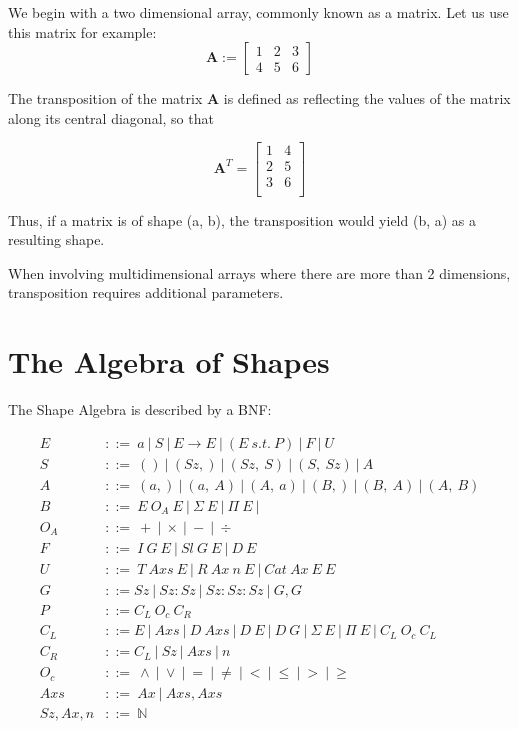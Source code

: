 \documentclass{article}
\begin{document}
We begin with a two dimensional array, commonly known as a matrix. Let us use this matrix for example:
\begin{equation*}
  \mathbf{A} :=
\begin{bmatrix}
  1 & 2 & 3\\
  4 & 5 & 6
\end{bmatrix}
\end{equation*}

The transposition of the matrix $\mathbf{A}$ is defined as reflecting the values of the matrix along its central diagonal, so that

\begin{equation*}
  \mathbf{A}^T =
  \begin{bmatrix}
    1 & 4\\
    2 & 5\\
    3 & 6\\
  \end{bmatrix}
\end{equation*}

Thus, if a matrix is of shape (a, b), the transposition would yield (b, a) as a resulting shape.

When involving multidimensional arrays where there are more than 2 dimensions, transposition requires additional parameters.

\section {The Algebra of Shapes}

The Shape Algebra is described by a BNF:

\begin{align*}
  E &::=\ a\ |\ S\ |\ E \rightarrow E\ |\ (E\ s.t.\ P)\ |\ F\ |\ U\\
  S &::=\ ()\ |\ (Sz,)\ |\ (Sz,\ S)\ |\ (S,\ Sz)\ |\ A \\
  A &::=\ (a,)\ |\ (a,\ A)\ |\ (A,\ a)\ |\ (B,)\ |\ (B,\ A)\ |\ (A,\ B)\\
  B &::=\ E\ O_A\ E\ |\ \Sigma\ E\ |\ \Pi\ E\ | \\
  O_A &::=\ +\ |\ \times\ |\ -\ |\ \div \\
  F &::=\ I\ G\ E\ |\ Sl\ G\ E\ |\ D\ E\ \\
  U &::=\ T\ Axs\ E\ |\ R\ Ax\ n\ E\ |\ Cat\ Ax\ E\ E \\
  G &::= Sz\ |\ Sz:Sz\ |\ Sz:Sz:Sz\ |\ G,G\ \\
  P &::= C_L\ O_c\ C_R\\
  C_L &::= E\ |\ Axs\ |\ D\ Axs\ |\ D\ E\ |\ D\ G\ |\ \Sigma\ E\ |\ \Pi\ E\ |\ C_L\ O_c\ C_L \\
  C_R &::= C_L\ |\ Sz\ |\ Axs\ |\ n\\
  O_c &::=\ \wedge\ |\ \vee\ |\ =\ |\ \neq\ |\ <\ |\ \leq\ |\ >\ |\ \geq\\
  Axs &::=\ Ax\ |\ Axs, Axs \\
  Sz, Ax, n &::=\ \mathbb{N}
\end{align*}
\end{document}
